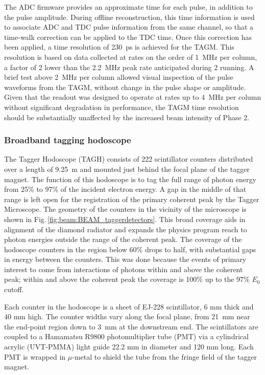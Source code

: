 The ADC firmware provides an approximate time for each pulse, in addition to the
pulse amplitude. During offline reconstruction, this time information is used to
associate ADC and TDC pulse information from the same channel, so that a
time-walk correction can be applied to the TDC time. Once this correction
has been applied, a time resolution of 230~ps is achieved for the TAGM.
This resolution is based on data collected at rates on the order of 1~MHz
per column, a factor of 2 lower than the 2.2~MHz peak rate anticipated during
\gx{} 2 running. A brief test above 2~MHz per column allowed visual
inspection of the pulse waveforms from the TAGM, without change in the
pulse shape or amplitude. Given that the readout was designed
to operate at rates up to 4~MHz per column without significant degradation
in performance, the TAGM time resolution should be
substantially unaffected by the increased beam intensity of \GX{} Phase 2.

\subsubsection{Broadband tagging hodoscope}\label{sec:TAGHIntro}
The Tagger Hodoscope (TAGH) consists of 222 scintillator counters distributed over a length of 9.25~m and mounted just behind the focal plane of the tagger magnet.
The function of this hodoscope is to tag the full range of photon energy from 25\% to 97\%
of the incident electron energy. A gap in the middle of that range is left open for the registration of the primary coherent peak by the Tagger Microscope. The geometry of the counters in the
vicinity of the microscope is shown in Fig.\,\ref{fig:beam:BEAM_taggerdetectors}. 
This broad coverage aids in alignment of the diamond radiator and expands the \GX{} physics program reach to photon energies outside the range of the coherent peak.
The coverage of the hodoscope counters in the region below 60\% drops to half,
with substantial gaps in energy between the counters. This was done because
the events of primary interest to \GX{} come from interactions of photons
within and above the coherent peak; 
within and above the coherent peak the coverage is 100\% up to the 97\% $E_0$ cutoff.

Each counter in the hodoscope is a sheet of EJ-228 scintillator, 6 mm thick and
40 mm high. The counter widths vary along the focal plane, from 21~mm near the
end-point region down to 3~mm at the downstream end. The scintillators are
coupled to a Hamamatsu R9800 photomultiplier tube (PMT) via a cylindrical acrylic (UVT-PMMA) light
guide 22.2 mm in diameter and 120 mm long. Each PMT is wrapped in $\mu$-metal
to shield the tube from the fringe field of the tagger magnet.

